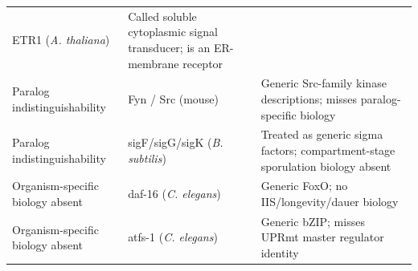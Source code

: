 \documentclass[
  11pt,
]{article}
\begin{document}
\begin{longtable}[]{@{}lll@{}}
\begin{minipage}[t]{0.30\columnwidth}
ETR1 (\emph{A. thaliana})\strut
\end{minipage} & \begin{minipage}[t]{0.30\columnwidth}\raggedright
Called soluble cytoplasmic signal transducer; is an ER-membrane
receptor\strut
\end{minipage}\tabularnewline
\begin{minipage}[t]{0.30\columnwidth}\raggedright
Paralog indistinguishability\strut
\end{minipage} & \begin{minipage}[t]{0.30\columnwidth}\raggedright
Fyn / Src (mouse)\strut
\end{minipage} & \begin{minipage}[t]{0.30\columnwidth}\raggedright
Generic Src-family kinase descriptions; misses paralog-specific
biology\strut
\end{minipage}\tabularnewline
\begin{minipage}[t]{0.30\columnwidth}\raggedright
Paralog indistinguishability\strut
\end{minipage} & \begin{minipage}[t]{0.30\columnwidth}\raggedright
sigF/sigG/sigK (\emph{B. subtilis})\strut
\end{minipage} & \begin{minipage}[t]{0.30\columnwidth}\raggedright
Treated as generic sigma factors; compartment-stage sporulation biology
absent\strut
\end{minipage}\tabularnewline
\begin{minipage}[t]{0.30\columnwidth}\raggedright
Organism-specific biology absent\strut
\end{minipage} & \begin{minipage}[t]{0.30\columnwidth}\raggedright
daf-16 (\emph{C. elegans})\strut
\end{minipage} & \begin{minipage}[t]{0.30\columnwidth}\raggedright
Generic FoxO; no IIS/longevity/dauer biology\strut
\end{minipage}\tabularnewline
\begin{minipage}[t]{0.30\columnwidth}\raggedright
Organism-specific biology absent\strut
\end{minipage} & \begin{minipage}[t]{0.30\columnwidth}\raggedright
atfs-1 (\emph{C. elegans})\strut
\end{minipage} & \begin{minipage}[t]{0.30\columnwidth}\raggedright
Generic bZIP; misses UPRmt master regulator identity\strut

\end{minipage}
\end{longtable}
\end{document}
